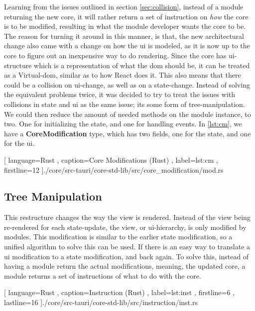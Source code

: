 Learning from the issues outlined in section \ref{sec:collision}, instead of a
module returning the new core, it will rather return a set of instruction on
\textit{how} the core is to be modified, resulting in what the module developer
wants the core to be. The reason for turning it around in this manner, is that,
the new architectural change also came with a change on how the \gls{ui} is
modeled, as it is now up to the core to figure out an inexpensive way to do
rendering. Since the core has \gls{ui}-structure which is a representation of
what the \gls{dom} should be, it can be treated as a Virtual-\gls{dom}, similar
as to how React does it. This also means that there could be a collision on
\gls{ui}-change, as well as on a state-change. Instead of solving the equivalent
problems twice, it was decided to try to treat the issues with collisions in
state and \gls{ui} as the same issue; its some form of tree-manipulation. We
could then reduce the amount of needed methods on the module instance, to two.
One for initializing the state, and one for handling events. In \ref{lst:cm},
we have a \textbf{CoreModification} type, which has two fields, one for the
state, and one for the \gls{ui}.

\begin{center}
  
    [ language=Rust
    , caption={Core Modifications (Rust)}
    , label=lst:cm
    , firstline=12
    ]{./core/src-tauri/core-std-lib/src/core_modification/mod.rs}
\end{center}

\subsection{Tree Manipulation}

This restructure changes the way the view is rendered. Instead of the view being
re-rendered for each state-update, the view, or \gls{ui}-hierarchy, is only
modified by modules. This modification is similar to the earlier state
modification, so a unified algorithm to solve this can be used. If there is an
easy way to translate a \gls{ui} modification to a state modification, and back
again. To solve this, instead of having a module return the actual
modifications, meaning, the updated core, a module returns a set of instructions
of what to do with the core.

\begin{center}
  
   [ language=Rust
   , caption={Instruction (Rust)}
   , label=lst:inst
   , firstline=6
   , lastline=16
   ]{./core/src-tauri/core-std-lib/src/instruction/inst.rs}
\end{center}

